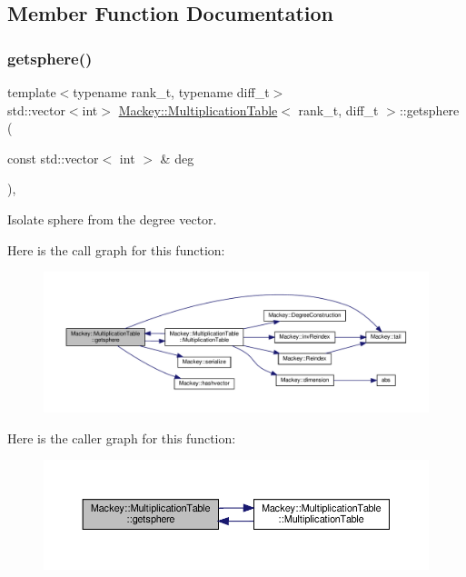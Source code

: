 \subsection{Member Function Documentation}
\mbox{\label{classMackey_1_1MultiplicationTable_ad4245f4a8122f0661f969498ef53f999}} 
\subsubsection{\texorpdfstring{getsphere()}{getsphere()}}
{\footnotesize\ttfamily template$<$typename rank\+\_\+t, typename diff\+\_\+t$>$ \\
std\+::vector$<$int$>$ \hyperlink{classMackey_1_1MultiplicationTable}{Mackey\+::\+Multiplication\+Table}$<$ rank\+\_\+t, diff\+\_\+t $>$\+::getsphere (\begin{DoxyParamCaption}\item[{const std\+::vector$<$ int $>$ \&}]{deg }\end{DoxyParamCaption})\hspace{0.3cm}{\ttfamily [inline]}, {\ttfamily [protected]}}



Isolate sphere from the degree vector. 

Here is the call graph for this function\+:\nopagebreak
\begin{figure}[H]
\begin{center}
\leavevmode
\includegraphics[width=350pt]{classMackey_1_1MultiplicationTable_ad4245f4a8122f0661f969498ef53f999_cgraph}
\end{center}
\end{figure}
Here is the caller graph for this function\+:\nopagebreak
\begin{figure}[H]
\begin{center}
\leavevmode
\includegraphics[width=350pt]{classMackey_1_1MultiplicationTable_ad4245f4a8122f0661f969498ef53f999_icgraph}
\end{center}
\end{figure}


